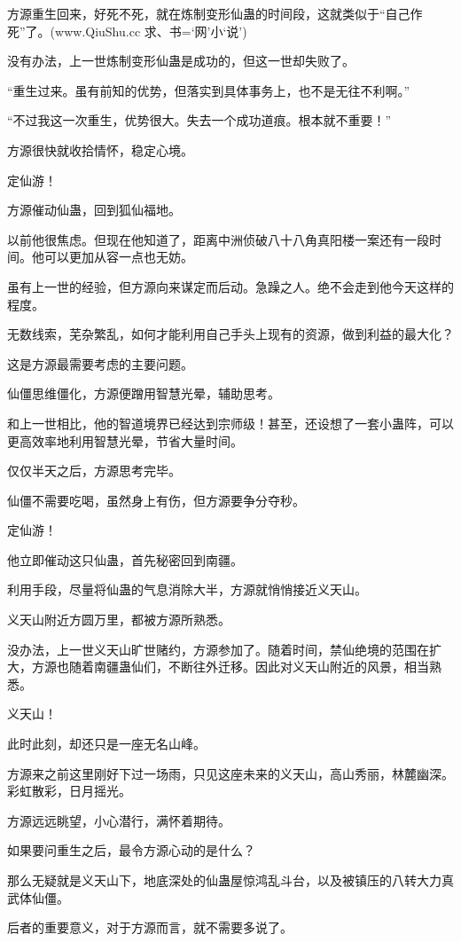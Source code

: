 \begin{this_body}
方源重生回来，好死不死，就在炼制变形仙蛊的时间段，这就类似于“自己作死”了。(www.QiuShu.cc 求、书=‘网’小‘说’)

没有办法，上一世炼制变形仙蛊是成功的，但这一世却失败了。

“重生过来。虽有前知的优势，但落实到具体事务上，也不是无往不利啊。”

“不过我这一次重生，优势很大。失去一个成功道痕。根本就不重要！”

方源很快就收拾情怀，稳定心境。

定仙游！

方源催动仙蛊，回到狐仙福地。

以前他很焦虑。但现在他知道了，距离中洲侦破八十八角真阳楼一案还有一段时间。他可以更加从容一点也无妨。

虽有上一世的经验，但方源向来谋定而后动。急躁之人。绝不会走到他今天这样的程度。

无数线索，芜杂繁乱，如何才能利用自己手头上现有的资源，做到利益的最大化？

这是方源最需要考虑的主要问题。

仙僵思维僵化，方源便蹭用智慧光晕，辅助思考。

和上一世相比，他的智道境界已经达到宗师级！甚至，还设想了一套小蛊阵，可以更高效率地利用智慧光晕，节省大量时间。

仅仅半天之后，方源思考完毕。

仙僵不需要吃喝，虽然身上有伤，但方源要争分夺秒。

定仙游！

他立即催动这只仙蛊，首先秘密回到南疆。

利用手段，尽量将仙蛊的气息消除大半，方源就悄悄接近义天山。

义天山附近方圆万里，都被方源所熟悉。

没办法，上一世义天山旷世赌约，方源参加了。随着时间，禁仙绝境的范围在扩大，方源也随着南疆蛊仙们，不断往外迁移。因此对义天山附近的风景，相当熟悉。

义天山！

此时此刻，却还只是一座无名山峰。

方源来之前这里刚好下过一场雨，只见这座未来的义天山，高山秀丽，林麓幽深。彩虹散彩，日月摇光。

方源远远眺望，小心潜行，满怀着期待。

如果要问重生之后，最令方源心动的是什么？

那么无疑就是义天山下，地底深处的仙蛊屋惊鸿乱斗台，以及被镇压的八转大力真武体仙僵。

后者的重要意义，对于方源而言，就不需要多说了。


\end{this_body}
